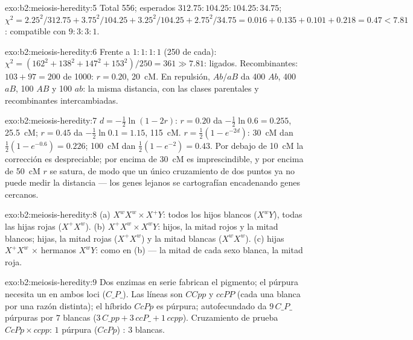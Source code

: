 \begin{solution}{exo:b2:meiosis-heredity:5}
Total 556; esperados $312.75 : 104.25 : 104.25 : 34.75$; $\chi^2 =
2.25^2/312.75 + 3.75^2/104.25 + 3.25^2/104.25 + 2.75^2/34.75 = 0.016
+ 0.135 + 0.101 + 0.218 = 0.47 < 7.81$: compatible con $9 : 3 : 3 :
1$.
\end{solution}

\begin{solution}{exo:b2:meiosis-heredity:6}
Frente a $1 : 1 : 1 : 1$ (250 de cada): $\chi^2 = (162^2 + 138^2 + 147^2
+ 153^2)/250 = 361 \gg 7.81$: ligados. Recombinantes: $103 + 97 = 200$
de 1000: $r = 0.20$, \qty{20}{cM}. En repulsión, $Ab/aB$ da 400
$Ab$, 400 $aB$, 100 $AB$ y 100 $ab$: la misma distancia, con las clases
parentales y recombinantes intercambiadas.
\end{solution}

\begin{solution}{exo:b2:meiosis-heredity:7}
$d = -\tfrac12\ln(1 - 2r)$: $r = 0.20$ da $-\tfrac12\ln 0.6 =
0.255$, \qty{25.5}{cM}; $r = 0.45$ da $-\tfrac12\ln 0.1 = 1.15$,
\qty{115}{cM}. $r = \tfrac12(1 - e^{-2d})$: \qty{30}{cM} dan
$\tfrac12(1 - e^{-0.6}) = 0.226$; \qty{100}{cM} dan $\tfrac12(1 -
e^{-2}) = 0.43$. Por debajo de \qty{10}{cM} la corrección es
despreciable; por encima de \qty{30}{cM} es imprescindible, y por encima
de \qty{50}{cM} $r$ se satura, de modo que un único cruzamiento de dos
puntos ya no puede medir la distancia --- los genes lejanos se
cartografían encadenando genes cercanos.
\end{solution}

\begin{solution}{exo:b2:meiosis-heredity:8}
(a) $X^wX^w \times X^+Y$: todos los hijos blancos ($X^wY$), todas las
hijas rojas ($X^+X^w$). (b) $X^+X^w \times X^wY$: hijos, la mitad rojos y
la mitad blancos; hijas, la mitad rojas ($X^+X^w$) y la mitad blancas
($X^wX^w$). (c) hijas
$X^+X^w$ $\times$ hermanos $X^wY$: como en (b) --- la mitad de cada sexo
blanca, la mitad roja.
\end{solution}

\begin{solution}{exo:b2:meiosis-heredity:9}
Dos enzimas en serie fabrican el pigmento; el púrpura necesita un 
 en ambos loci ($C\_P\_$). Las líneas son $CCpp$ y $ccPP$ (cada
una blanca por una razón distinta); el híbrido $CcPp$ es púrpura;
autofecundado da $9\,C\_P\_$ púrpuras por $7$ blancas ($3\,C\_pp + 3\,ccP\_ +
1\,ccpp$). Cruzamiento de prueba $CcPp\times ccpp$: $1$ púrpura
($CcPp$) : $3$
blancas.
\end{solution}

